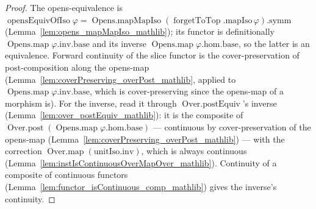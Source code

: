 \begin{proof}
  The opens-equivalence is \(\operatorname{opensEquivOfIso}\varphi = \operatorname{Opens.mapMapIso}
  (\operatorname{forgetToTop}.\mathrm{mapIso}\,\varphi).\mathrm{symm}\)
  (Lemma~\ref{lem:opens_mapMapIso_mathlib}); its functor is definitionally
  \(\operatorname{Opens.map}\varphi.\mathrm{inv}.\mathrm{base}\) and its inverse
  \(\operatorname{Opens.map}\varphi.\mathrm{hom}.\mathrm{base}\), so the latter is an equivalence.
  Forward continuity of the slice functor is the cover-preservation of post-composition along the
  opens-map (Lemma~\ref{lem:coverPreserving_overPost_mathlib}, applied to
  \(\operatorname{Opens.map}\varphi.\mathrm{inv}.\mathrm{base}\), which is cover-preserving since the
  opens-map of a morphism is). For the inverse, read it through \(\operatorname{Over.postEquiv}\)'s
  inverse (Lemma~\ref{lem:over_postEquiv_mathlib}): it is the composite of
  \(\operatorname{Over.post}(\operatorname{Opens.map}\varphi.\mathrm{hom}.\mathrm{base})\) --- continuous
  by cover-preservation of the opens-map (Lemma~\ref{lem:coverPreserving_overPost_mathlib}) --- with the
  correction \(\operatorname{Over.map}(\mathrm{unitIso}.\mathrm{inv})\), which is always continuous
  (Lemma~\ref{lem:instIsContinuousOverMapOver_mathlib}). Continuity of a composite of continuous
  functors (Lemma~\ref{lem:functor_isContinuous_comp_mathlib}) gives the inverse's continuity.
\end{proof}

